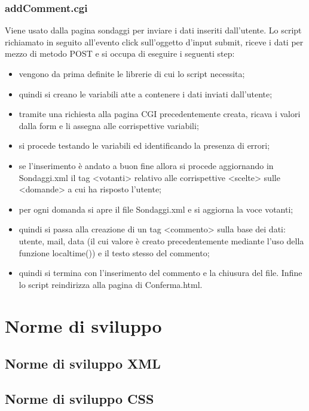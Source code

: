\documentclass[10pt,a4paper,onecolumn]{article}
\begin{document}
\subsubsection{addComment.cgi}
Viene usato dalla pagina sondaggi per inviare i dati inseriti dall'utente. Lo script richiamato in seguito all'evento click sull'oggetto d'input submit, riceve i dati per mezzo di metodo POST e si occupa di eseguire i seguenti step:
\begin{itemize}
  \item vengono da prima definite le librerie di cui lo script necessita;
  \item quindi si creano le variabili atte a contenere i dati inviati dall'utente;
  \item tramite una richiesta alla pagina CGI precedentemente creata, ricava i valori dalla form e li assegna alle corrispettive variabili;
  \item si procede testando le variabili ed identificando la presenza di errori;
  \item se l'inserimento è andato a buon fine allora si procede aggiornando in Sondaggi.xml il tag <votanti> relativo alle corrispettive <scelte> sulle <domande> a cui ha risposto l'utente;
  \item per ogni domanda si apre il file Sondaggi.xml e si aggiorna la voce votanti;
  \item quindi si passa alla creazione di un tag <commento> sulla base dei dati: utente, mail, data (il cui valore è creato precedentemente mediante l'uso della funzione localtime()) e il testo stesso del commento;
  \item quindi si termina con l'inserimento del commento e la chiusura del file. Infine lo script reindirizza alla pagina di Conferma.html.
\end{itemize}

\clearpage

\section{Norme di sviluppo}

\subsection{Norme di sviluppo XML}

\subsection{Norme di sviluppo CSS}
\end{document}
